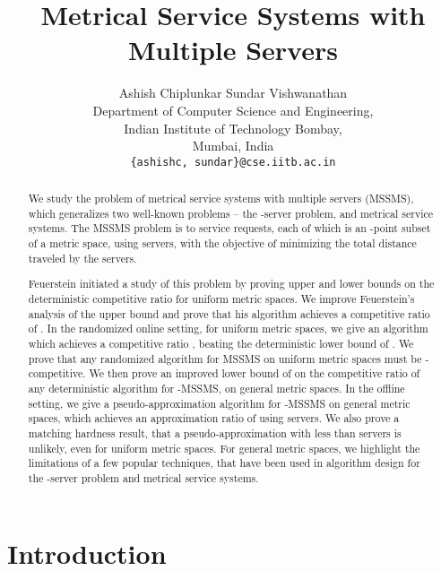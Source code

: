 \documentclass[11pt]{article}
\theoremstyle{plain}\newtheorem{theorem}{Theorem}
\theoremstyle{definition}
\theoremstyle{remark}
\begin{document}
\title{Metrical Service Systems with Multiple Servers}
\author{Ashish Chiplunkar \qquad Sundar Vishwanathan\\
Department of Computer Science and Engineering,\\
Indian Institute of Technology Bombay,\\
Mumbai, India\\
\texttt{\{ashishc, sundar\}@cse.iitb.ac.in}
}
\date{}
\maketitle

\begin{abstract}
We study the problem of metrical service systems with multiple servers (MSSMS), which generalizes two well-known problems -- the -server problem, and metrical service systems. 
The MSSMS problem is to service requests, each of which is an -point subset of a metric space, using  servers, with the objective of minimizing the total distance traveled by the servers.


Feuerstein \cite{Feuerstein98} initiated a study of this problem by proving upper and lower bounds on the deterministic competitive ratio for uniform metric spaces. We improve Feuerstein's analysis of the upper bound and prove that his algorithm achieves a competitive ratio of .
In the randomized online setting, for uniform metric spaces, we give an algorithm which achieves a competitive ratio , beating the deterministic lower bound of .
We prove that any randomized algorithm for MSSMS on uniform metric spaces must be -competitive. We then prove an improved lower bound of  on the competitive ratio of any deterministic algorithm for -MSSMS, on general metric spaces. In the offline setting, we give a pseudo-approximation algorithm for -MSSMS on general metric spaces, which achieves an approximation ratio of  using  servers. We also prove a matching hardness result, that a pseudo-approximation with less than  servers is unlikely, even for uniform metric spaces. For general metric spaces, we highlight the limitations of a few popular techniques, that have been used in algorithm design for the -server problem and metrical service systems.
\end{abstract}

\section{Introduction}
\end{document}
